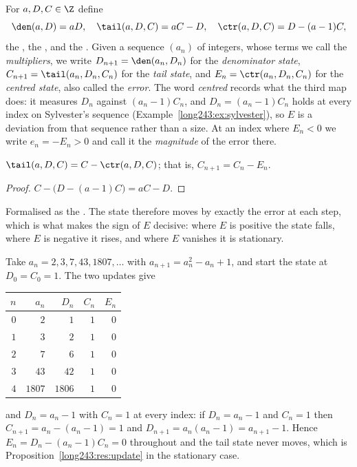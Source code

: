 For $a,D,C\in\Z$ define
\[
 \den(a,D)=aD,
 \quad
 \tail(a,D,C)=aC-D,
 \quad
 \ctr(a,D,C)=D-(a-1)C ,
\]
the
, the
,
and the
.
Given a sequence $(a_n)$ of integers, whose terms we call the
\emph{multipliers}, we write $D_{n+1}=\den(a_n,D_n)$ for the \emph{denominator
state}, $C_{n+1}=\tail(a_n,D_n,C_n)$ for the \emph{tail state}, and
$E_n=\ctr(a_n,D_n,C_n)$ for the \emph{centred state}, also called the
\emph{error}.  The word \emph{centred} records what the third map does: it
measures $D_n$ against $(a_n-1)C_n$, and $D_n=(a_n-1)C_n$ holds at every index
on Sylvester's sequence (Example~\ref{long243:ex:sylvester}), so $E$ is a deviation
from that sequence rather than a size.  At an index where $E_n<0$ we write
$e_n=-E_n>0$ and call it the \emph{magnitude} of the error there.

\begin{proposition}\label{long243:res:update}
$\tail(a,D,C)=C-\ctr(a,D,C)$; that is, $C_{n+1}=C_n-E_n$.
\end{proposition}

\begin{proof}
$C-\bigl(D-(a-1)C\bigr)=aC-D$.
\end{proof}

\noindent Formalised as the
.  The state therefore moves by exactly the error at each step, which is
what makes the sign of $E$ decisive: where $E$ is positive the state falls,
where $E$ is negative it rises, and where $E$ vanishes it is stationary.

\begin{example}\label{long243:ex:sylvester}
Take $a_n=2,3,7,43,1807,\ldots$ with $a_{n+1}=a_n^{2}-a_n+1$, and start the
state at $D_0=C_0=1$.  The two updates give

\begin{center}
\begin{tabular}{@{}rrrrr@{}}
\toprule
$n$ & $a_n$ & $D_n$ & $C_n$ & $E_n$\\
\midrule
$0$ & $2$ & $1$ & $1$ & $0$\\
$1$ & $3$ & $2$ & $1$ & $0$\\
$2$ & $7$ & $6$ & $1$ & $0$\\
$3$ & $43$ & $42$ & $1$ & $0$\\
$4$ & $1807$ & $1806$ & $1$ & $0$\\
\bottomrule
\end{tabular}
\end{center}

\noindent and $D_n=a_n-1$ with $C_n=1$ at every index: if $D_n=a_n-1$ and
$C_n=1$ then $C_{n+1}=a_n-(a_n-1)=1$ and $D_{n+1}=a_n(a_n-1)=a_{n+1}-1$.
Hence $E_n=D_n-(a_n-1)C_n=0$ throughout and the tail state never moves, which
is Proposition~\ref{long243:res:update} in the stationary case.
\end{example}

